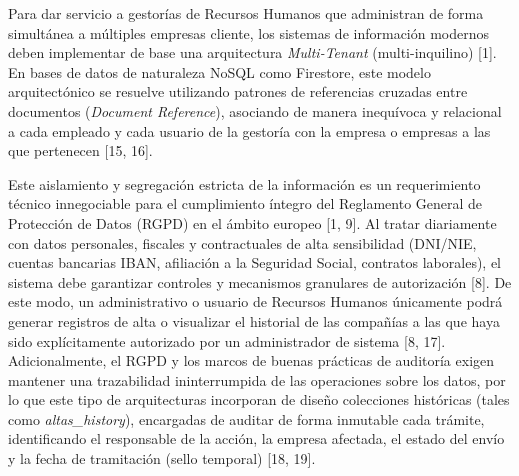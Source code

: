 Para dar servicio a gestorías de Recursos Humanos que administran de forma simultánea a múltiples empresas cliente, los sistemas de información modernos deben implementar de base una arquitectura \textit{Multi-Tenant} (multi-inquilino) \cite{primera_entrega} [1]. En bases de datos de naturaleza NoSQL como Firestore, este modelo arquitectónico se resuelve utilizando patrones de referencias cruzadas entre documentos (\textit{Document Reference}), asociando de manera inequívoca y relacional a cada empleado y cada usuario de la gestoría con la empresa o empresas a las que pertenecen \cite{documento_diseno} [15, 16].

Este aislamiento y segregación estricta de la información es un requerimiento técnico innegociable para el cumplimiento íntegro del Reglamento General de Protección de Datos (RGPD) en el ámbito europeo \cite{primera_entrega, proyecto_alta} [1, 9]. Al tratar diariamente con datos personales, fiscales y contractuales de alta sensibilidad (DNI/NIE, cuentas bancarias IBAN, afiliación a la Seguridad Social, contratos laborales), el sistema debe garantizar controles y mecanismos granulares de autorización \cite{proyecto_alta} [8]. De este modo, un administrativo o usuario de Recursos Humanos únicamente podrá generar registros de alta o visualizar el historial de las compañías a las que haya sido explícitamente autorizado por un administrador de sistema \cite{blog_diario, proyecto_alta} [8, 17]. Adicionalmente, el RGPD y los marcos de buenas prácticas de auditoría exigen mantener una trazabilidad ininterrumpida de las operaciones sobre los datos, por lo que este tipo de arquitecturas incorporan de diseño colecciones históricas (tales como \textit{altas\_history}), encargadas de auditar de forma inmutable cada trámite, identificando el responsable de la acción, la empresa afectada, el estado del envío y la fecha de tramitación (sello temporal) \cite{blog_diario, proyecto_alta} [18, 19].